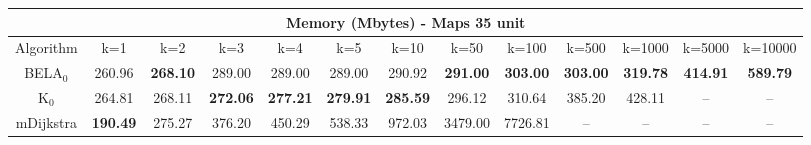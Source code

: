 \begin{tabular}{c|cccccccccccc}\toprule
\multicolumn{13}{c}{Memory (Mbytes) - Maps 35 unit}\\ \midrule
Algorithm & k=1 & k=2 & k=3 & k=4 & k=5 & k=10 & k=50 & k=100 & k=500 & k=1000 & k=5000 & k=10000 \\ \midrule
BELA$_0$ & 260.96 & \textbf{268.10} & 289.00 & 289.00 & 289.00 & 290.92 & \textbf{291.00} & \textbf{303.00} & \textbf{303.00} & \textbf{319.78} & \textbf{414.91} & \textbf{589.79} \\
K$_0$ & 264.81 & 268.11 & \textbf{272.06} & \textbf{277.21} & \textbf{279.91} & \textbf{285.59} & 296.12 & 310.64 & 385.20 & 428.11 & -- & -- \\
mDijkstra & \textbf{190.49} & 275.27 & 376.20 & 450.29 & 538.33 & 972.03 & 3479.00 & 7726.81 & -- & -- & -- & -- \\ \bottomrule 
\end{tabular}
